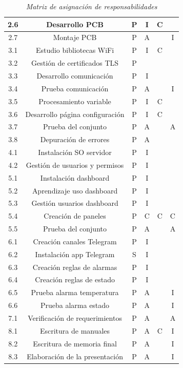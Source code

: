 \documentclass[11pt]{charter}
\begin{document}
\begin{table}[htpb]
{\begin{tabular}{|c|c|c|c|c|c|}
 2.6&Desarrollo PCB  & P  & I & C &\\ \hline
 2.7&Montaje PCB  & P  & A &  & I\\ \hline
 3.1&Estudio bibliotecas WiFi  & P & I & C &\\ \hline
 3.2&Gestión de certificados TLS  & P &  &  &\\ \hline
 3.3&Desarrollo comunicación  & P & I &  &\\ \hline
 3.4&Prueba comunicación  & P & A &  & I\\ \hline
 3.5&Procesamiento variable  & P  & I & C &\\ \hline
 3.6&Desarrollo página configuración & P  & I & C &\\ \hline
 3.7&Prueba del conjunto  & P & A &  & A\\ \hline
 3.8&Depuración de errores  & P & A &  &\\ \hline
 4.1&Instalación SO servidor  & P & I &  &\\ \hline
 4.2&Gestión de usuarios y permisos & P & I &  &\\ \hline
 5.1&Instalación dashboard  & P & I &  &\\ \hline 
 5.2&Aprendizaje uso dashboard  & P & I &  &\\ \hline
 5.3&Gestión usuarios dashboard  & P & I &  &\\ \hline
 5.4&Creación de paneles  & P & C & C & C\\ \hline
 5.5&Prueba del conjunto  & P & A &  & A\\ \hline
 6.1&Creación canales Telegram  & P & I &  &\\ \hline
 6.2&Instalación app Telegram & S & I &  &  \\ \hline
 6.3&Creación reglas de alarmas & P & I &  &\\ \hline
 6.4&Creación reglas de estado & P & I &  &\\ \hline
 6.5&Prueba alarma temperatura & P & A &  & I\\ \hline
 6.6&Prueba alarma estado & P & A &  & I \\ \hline
 7.1&Verificación de requerimientos & P & A &  & A\\ \hline
 8.1&Escritura de manuales & P & A & C & I\\ \hline
 8.2&Escritura de memoria final & P & A &  & I\\ \hline
 8.3&Elaboración de la presentación & P & A &  & I\\ \hline

\end{tabular}%
}
\caption{\textit{Matriz de asignación de responsabilidades}}
\label{tab:resp}
\end{table}
\end{document}
